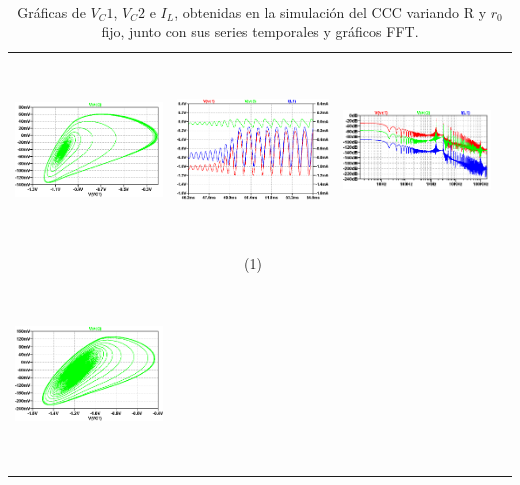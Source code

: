 \documentclass{rbf}
\begin{document}
\begin{table}[h]
    \centering
    \caption{\label{tab:$r_0$ fijo y variando R en el CCC} Gráficas de $V_C1$, $V_C2$ e $I_L$, obtenidas en la simulación del CCC variando R y $r_0$ fijo, junto con sus series temporales y gráficos FFT.}\\
        \begin{tabular}{c c c c}
        \hline    
        \includegraphics[width=5cm,height=5cm]{R7/1303 C0 atractor.png}&
        \includegraphics[width=5cm,height=5cm]{R7/1303 C0 ts.png}&
        \includegraphics[width=5cm,height=5cm]{R7/1303 C0 fft.png}&\\
        & (1) & \\
        \includegraphics[width=5cm,height=5cm]{R7/1379 C 0 720ms atractor.png}&

\end{tabular}
\end{table}
\end{document}
